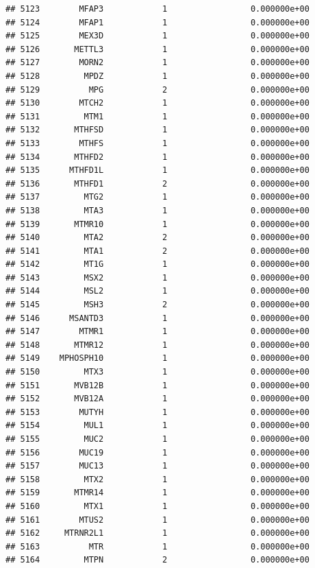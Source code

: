 \documentclass[
]{article}
\begin{document}
\begin{verbatim}
## 5123        MFAP3            1                 0.000000e+00
## 5124        MFAP1            1                 0.000000e+00
## 5125        MEX3D            1                 0.000000e+00
## 5126       METTL3            1                 0.000000e+00
## 5127        MORN2            1                 0.000000e+00
## 5128         MPDZ            1                 0.000000e+00
## 5129          MPG            2                 0.000000e+00
## 5130        MTCH2            1                 0.000000e+00
## 5131         MTM1            1                 0.000000e+00
## 5132       MTHFSD            1                 0.000000e+00
## 5133        MTHFS            1                 0.000000e+00
## 5134       MTHFD2            1                 0.000000e+00
## 5135      MTHFD1L            1                 0.000000e+00
## 5136       MTHFD1            2                 0.000000e+00
## 5137         MTG2            1                 0.000000e+00
## 5138         MTA3            1                 0.000000e+00
## 5139       MTMR10            1                 0.000000e+00
## 5140         MTA2            2                 0.000000e+00
## 5141         MTA1            2                 0.000000e+00
## 5142         MT1G            1                 0.000000e+00
## 5143         MSX2            1                 0.000000e+00
## 5144         MSL2            1                 0.000000e+00
## 5145         MSH3            2                 0.000000e+00
## 5146      MSANTD3            1                 0.000000e+00
## 5147        MTMR1            1                 0.000000e+00
## 5148       MTMR12            1                 0.000000e+00
## 5149    MPHOSPH10            1                 0.000000e+00
## 5150         MTX3            1                 0.000000e+00
## 5151       MVB12B            1                 0.000000e+00
## 5152       MVB12A            1                 0.000000e+00
## 5153        MUTYH            1                 0.000000e+00
## 5154         MUL1            1                 0.000000e+00
## 5155         MUC2            1                 0.000000e+00
## 5156        MUC19            1                 0.000000e+00
## 5157        MUC13            1                 0.000000e+00
## 5158         MTX2            1                 0.000000e+00
## 5159       MTMR14            1                 0.000000e+00
## 5160         MTX1            1                 0.000000e+00
## 5161        MTUS2            1                 0.000000e+00
## 5162     MTRNR2L1            1                 0.000000e+00
## 5163          MTR            1                 0.000000e+00
## 5164         MTPN            2                 0.000000e+00

\end{verbatim}
\end{document}
